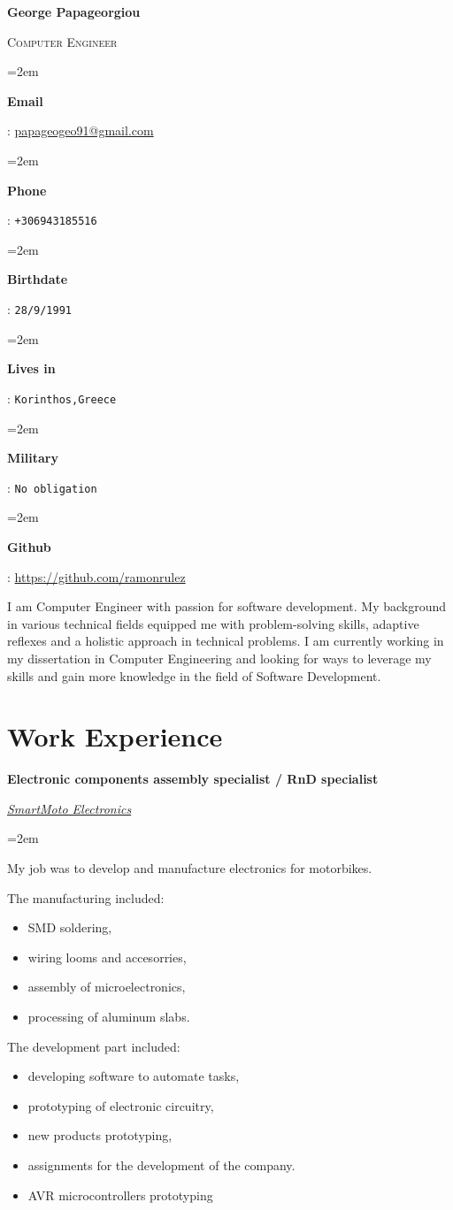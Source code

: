 \documentclass{article}
\newlength{\spacebox}
\newcommand{\sepspace}{\vspace*{1em}}
\newcommand{\name}[1]{
	\Huge	%
	\fontfamily{phv} \selectfont	%
	\begin{center}\textbf{#1}\end{center}	%
	\normalsize \normalfont	%
}
\newcommand{\quality}[1]{
	\Large
	\fontfamily{phv} \selectfont
	\begin{center}
		\textsc{#1}
	\end{center}
	\par
	\normalsize 
	\normalfont
}
\newcommand{\info}[2]{
	\noindent
	\hangindent=2em
	\hangafter=0	%
	\parbox{1.5\spacebox}{
		\textbf{#1}	%
	}
	: #2 \par	%
}
\newcommand{\about}[1]{
	\noindent
	\textsf{#1}
}
\newcommand{\work}[4]{
	\noindent \textbf{#1} %
	\hfill
	\framebox{	%
		\parbox{6em}{
			\centering{#2}}} \par
	\noindent\textit{#3} \par	%
	\vspace*{0.5em}
	\noindent\hangindent=2em\hangafter=0 \small #4	%
	\normalsize \par
}
\begin{document}
	\name{George Papageorgiou}
	\quality{Computer Engineer}
	\bigskip

	\info{Email}{\href{mailto:papageogeo91@gmail.com}{papageogeo91@gmail.com}}
	\info{Phone}{\texttt{+306943185516}}
	\info{Birthdate}{\texttt{28/9/1991}}
	\info{Lives in}{\texttt{Korinthos,Greece}}
	\info{Military}{\texttt{No obligation}}
	\info{Github}{\url{https://github.com/ramonrulez}}
	\bigskip

	\about{
		I am Computer Engineer with passion for software development. My background in various technical fields equipped me with problem-solving skills, adaptive reflexes and a holistic approach in technical problems.
	I am currently working in my dissertation in Computer Engineering and looking for ways to leverage my skills and gain more knowledge in the field of Software Development.
	}
	\section*{Work Experience}
	\work{Electronic components assembly specialist / RnD specialist}{2019--2024}{\href{https://smartmoto-electronics.com/}{SmartMoto Electronics}}{
		\begin{center}
			My job was to develop and manufacture electronics for motorbikes.
		\end{center}
		\begin{multicols}{2}	
			The manufacturing included:
			\begin{itemize}[noitemsep]
				\item SMD soldering,
				\item wiring looms and accesorries,
				\item assembly of microelectronics,
				\item processing of aluminum slabs.
			\end{itemize}
			\columnbreak
			
			The development part included:
			\begin{itemize}[noitemsep]
				\item developing software to automate tasks,
				\item prototyping of electronic circuitry,
				\item new products prototyping,
				\item assignments for the development of the company.
				\item AVR microcontrollers prototyping
			\end{itemize}
		\end{multicols}
	}
	\sepspace
\end{document}

